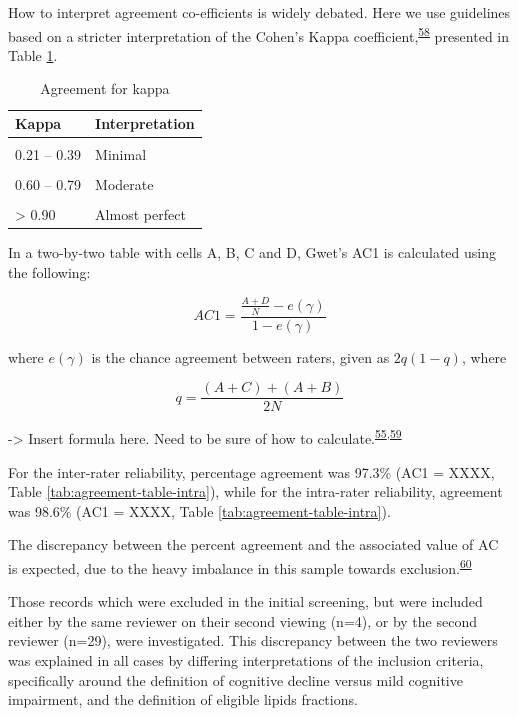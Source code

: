 \documentclass[a4paper, twoside]{templates/ociamthesis}
\begin{document}
How to interpret agreement co-efficients is widely debated. Here we use guidelines based on a stricter interpretation of the Cohen's Kappa coefficient,\textsuperscript{\protect\hyperlink{ref-mchugh2012}{58}} presented in Table \ref{tab:gwet-table}.

\begin{table}[!h]

\caption{\label{tab:gwet-table}Agreement for kappa}
\centering
\begin{tabular}[t]{ll}
\toprule
Kappa & Interpretation\\
\midrule
\cellcolor{gray!6}{0    – 0.20} & \cellcolor{gray!6}{None}\\
0.21 – 0.39 & Minimal\\
\cellcolor{gray!6}{0.40 – 0.59} & \cellcolor{gray!6}{Weak}\\
0.60 – 0.79 & Moderate\\
\cellcolor{gray!6}{0.80 – 0.90} & \cellcolor{gray!6}{Strong}\\
\addlinespace
> 0.90 & Almost perfect\\
\bottomrule
\end{tabular}
\end{table}

In a two-by-two table with cells A, B, C and D, Gwet's AC1 is calculated using the following:

\[AC1 = \frac{\frac{A+D}{N}-e(\gamma)}{1-e(\gamma)}\]

where \(e(\gamma)\) is the chance agreement between raters, given as \(2q(1-q)\), where

\[q = \frac{(A+C)+(A+B)}{2N}\]

-\textgreater{} Insert formula here. Need to be sure of how to calculate.\textsuperscript{\protect\hyperlink{ref-gwet2008}{55},\protect\hyperlink{ref-sim2005}{59}}

For the inter-rater reliability, percentage agreement was 97.3\% (AC1 = XXXX, Table \ref{tab:agreement-table-intra}), while for the intra-rater reliability, agreement was 98.6\% (AC1 = XXXX, Table \ref{tab:agreement-table-intra}).

The discrepancy between the percent agreement and the associated value of AC is expected, due to the heavy imbalance in this sample towards exclusion.\textsuperscript{\protect\hyperlink{ref-feinstein1990}{60}}

Those records which were excluded in the initial screening, but were included either by the same reviewer on their second viewing (n=4), or by the second reviewer (n=29), were investigated. This discrepancy between the two reviewers was explained in all cases by differing interpretations of the inclusion criteria, specifically around the definition of cognitive decline versus mild cognitive impairment, and the definition of eligible lipids fractions.
\end{document}

